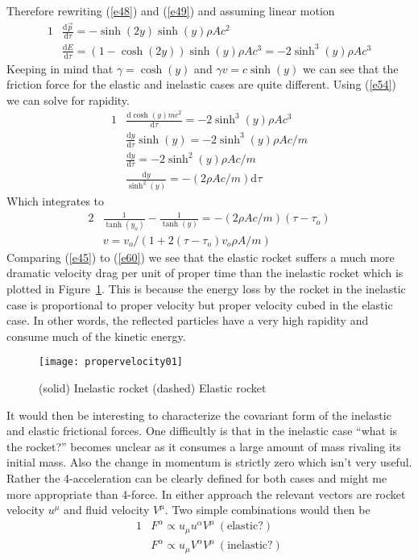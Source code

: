 \documentclass[]{article}
\numberwithin{equation}{subsection}
\begin{document}
Therefore rewriting (\ref{e48}) and (\ref{e49}) and assuming linear motion 
\begin{alignat}{1}
	\label{e53}	&\frac{\mathrm{d}\vec{p}}{\mathrm{d}\tau}=-\sinh(2y)\sinh(y)\rho Ac^{2}\\
	\label{e54}	&\frac{\mathrm{d}E}{\mathrm{d}\tau}=(1-\cosh(2y))\sinh(y)\rho Ac^{3}=-2\sinh^{3}(y)\rho Ac^{3}
\end{alignat}
Keeping in mind that $\gamma=\cosh(y)$ and $\gamma v=c\sinh(y)$ we can see that the friction force for the elastic and inelastic cases are quite different. Using (\ref{e54}) we can solve for rapidity.  
\begin{alignat}{1}
	\label{e55}	&\frac{\mathrm{d}\cosh(y)mc^{2}}{\mathrm{d}\tau}=-2\sinh^{3}(y)\rho Ac^{3}\\
	\label{e56}	&\frac{\mathrm{d}y}{\mathrm{d}\tau}\sinh(y)=-2\sinh^{3}(y)\rho Ac/m\\
	\label{e57}	&\frac{\mathrm{d}y}{\mathrm{d}\tau}=-2\sinh^{2}(y)\rho Ac/m\\
	\label{e58}	&\frac{\mathrm{d}y}{\sinh^{2}(y)}=-(2\rho Ac/m)\mathrm{d}\tau
\end{alignat}
Which integrates to
\begin{alignat}{2}
	\label{e59}	&\frac{1}{\tanh(y_{o})}-\frac{1}{\tanh(y)}=-(2\rho Ac/m)(\tau-\tau_{o})\\
	\label{e60}	&v=v_{o}/(1+2(\tau-\tau_{o})v_{o}\rho A/m)
\end{alignat}
Comparing (\ref{e45}) to (\ref{e60}) we see that the elastic rocket suffers a much more dramatic velocity drag per unit of proper time than the inelastic rocket which is plotted in Figure~\ref{fig03}. This is because the energy loss by the rocket in the inelastic case is proportional to proper velocity but proper velocity cubed in the elastic case. In other words, the reflected particles have a very high rapidity and consume much of the kinetic energy.
\begin{figure}[htbp]
	\centering
	\texttt{[image: propervelocity01]}
	\caption{(solid) Inelastic rocket (dashed) Elastic rocket}
	\label{fig03}
\end{figure}
It would then be interesting to characterize the covariant form of the inelastic and elastic frictional forces. One difficultly is that in the inelastic case ``what is the rocket?'' becomes unclear as it consumes a large amount of mass rivaling its initial mass. Also the change in momentum is strictly zero which isn't very useful. Rather the 4-acceleration can be clearly defined for both cases and might me more appropriate than 4-force. In either approach the relevant vectors are rocket velocity $u^{\mu}$ and fluid velocity $V^{\mu}$. Two simple combinations would then be  
\begin{alignat}{1}
	\label{e61}	&F^{\alpha}\propto u_{\mu}u^{\alpha}V^{\mu}\ \mathrm{(elastic?)}\\
	\label{e62}	&F^{\alpha}\propto u_{\mu}V^{\alpha}V^{\mu}\ \mathrm{(inelastic?)}
\end{alignat}
\end{document}
